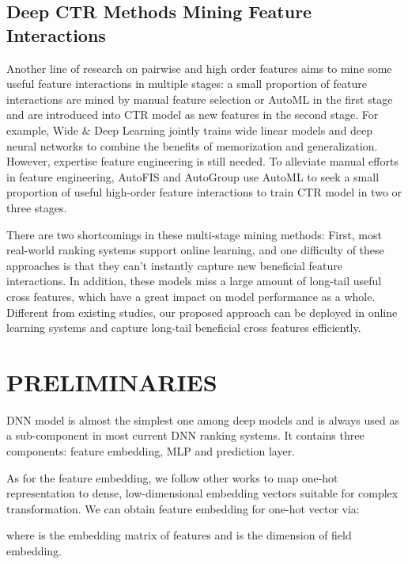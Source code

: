 \documentclass[sigconf,authorversion]{acmart}
\begin{document}
\subsection{Deep CTR Methods Mining Feature Interactions}

Another line of research on pairwise and high order features  aims to mine some useful feature interactions in multiple stages: a small proportion of feature interactions are mined by manual feature selection or AutoML in the first stage and are introduced into CTR model as new features in the second stage. For example, Wide \& Deep Learning\cite{cheng2016wide} jointly trains wide linear models and deep neural networks to combine the benefits of memorization and generalization. However, expertise feature engineering is still needed. To alleviate manual efforts in feature engineering, AutoFIS\cite{autofis020} and AutoGroup\cite{autogroup20} use AutoML to seek a small proportion of useful high-order feature interactions to train CTR model in two or three stages.

There are two shortcomings in these multi-stage mining methods: First, most real-world ranking systems support online learning, and one difficulty of these approaches is that they can't instantly capture new beneficial feature interactions. In addition, these models miss a large amount of long-tail useful cross features, which have a great impact on model performance  as a whole. Different from existing studies, our proposed approach can be deployed in online learning systems and capture long-tail beneficial cross features efficiently. 

\section{PRELIMINARIES}
DNN model is almost the simplest one among deep models and is always used as a sub-component in most current DNN ranking systems\cite{guo2017deepfm,wang2017deep,WangSCJLHC21,lian2018xdeepfm,HuangZZ19,cheng2016wide}. It contains three components: feature embedding, MLP and prediction layer. 

As for the feature embedding, we follow other works\cite{guo2017deepfm,wang2017deep,WangSCJLHC21,lian2018xdeepfm,HuangZZ19,cheng2016wide} to map one-hot representation to dense, low-dimensional embedding vectors suitable for complex transformation. We can obtain feature embedding  for one-hot vector  via:
  
where  is the embedding matrix of  features and  is the dimension of field embedding.
\end{document}
